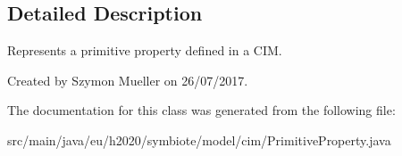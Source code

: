 \subsection{Detailed Description}
Represents a primitive property defined in a C\+IM.

Created by Szymon Mueller on 26/07/2017. 

The documentation for this class was generated from the following file\+:\begin{DoxyCompactItemize}
\item 
src/main/java/eu/h2020/symbiote/model/cim/Primitive\+Property.\+java\end{DoxyCompactItemize}
